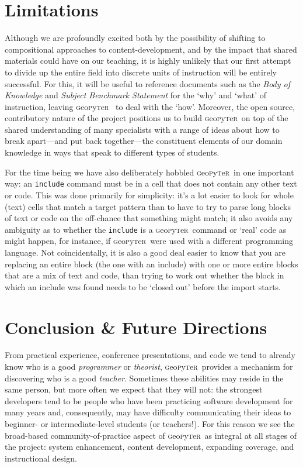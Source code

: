 \documentclass[letter, 11pt]{article}
\newcommand{\gp}{\textsc{g}eo\textsc{p}y\textsc{t}e\textsc{r}~\/}
\begin{document}
\section{Limitations}\label{limitations}

Although we are profoundly excited both by the possibility of shifting to
compositional approaches to content-development, and by the impact that shared
materials could have on our teaching, it is highly unlikely that our first
attempt to divide up the entire field into discrete units of instruction will be
entirely successful. For this, it will be useful to reference documents such as
the \textit{Body of Knowledge} \citep{bok2018} and \textit{Subject Benchmark
Statement} \citep{QAA2014} for the `why' and `what' of instruction, leaving \gp
to deal with the `how'. Moreover, the open source, contributory nature of the
project positions us to build \gp on top of the shared understanding of many
specialists with a range of ideas about how to break apart---and put back
together---the constituent elements of our domain knowledge in ways that speak
to different types of students.

For the time being we have also deliberately hobbled \gp in one important way:
an \texttt{include} command must be in a cell that does not contain any other
text or code. This was done primarily for simplicity: it's a lot easier to look
for whole (text) cells that match a target pattern than to have to try to parse
long blocks of text or code on the off-chance that something might match; it
also avoids any ambiguity as to whether the \texttt{include} is a \gp command or
`real' code as might happen, for instance, if \gp were used with a different
programming language. Not coincidentally, it is also a good deal easier to know
that you are replacing an entire block (the one with an include) with one or
more entire blocks that are a mix of text and code, than trying to work out
whether the block in which an include was found needs to be `closed out' before
the import starts.

\section{Conclusion \& Future Directions}\label{future}

From practical experience, conference presentations, and code we tend to already
know who is a good \emph{programmer} or \emph{theorist}, \gp provides a
mechanism for discovering who is a good \emph{teacher}. Sometimes these
abilities may reside in the same person, but more often we expect that they will
not: the strongest developers tend to be people who have been practicing
software development for many years and, consequently, may have difficulty
communicating their ideas to beginner- or intermediate-level students (or
teachers!). For this reason we see the broad-based community-of-practice aspect
of \gp as integral at all stages of the project: system enhancement, content
development, expanding coverage, and instructional design.
\end{document}
